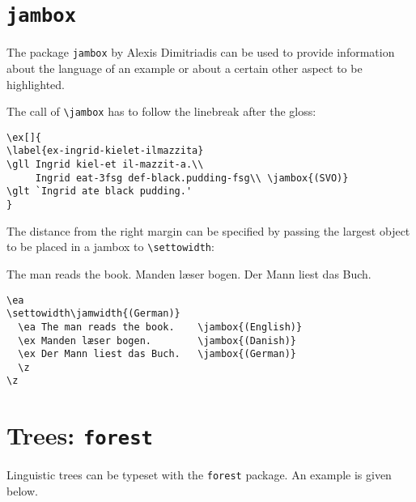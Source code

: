 \def\exfont{\normalsize\upshape}

\section{\texttt{jambox}}
\label{sec-jambox}


The package \texttt{jambox} by Alexis Dimitriadis can be used to provide information about the language of an example or
about a certain other aspect to be highlighted.
\settowidth{}
\eal
{}
\zl

The call of \verb+\jambox+ has to follow the linebreak after the gloss:
\begin{verbatim}
\ex[]{
\label{ex-ingrid-kielet-ilmazzita}
\gll Ingrid kiel-et il-mazzit-a.\\
     Ingrid eat-3fsg def-black.pudding-fsg\\ \jambox{(SVO)}
\glt `Ingrid ate black pudding.'
}
\end{verbatim}
The distance from the right margin can be specified by passing the largest object to be placed in a
jambox to \verb+\settowidth+:

\ea 
\settowidth{}
  \ea The man reads the book.    
  \ex Manden læser bogen.        
  \ex Der Mann liest das Buch.   
  \z 
\z

\begin{verbatim}
\ea 
\settowidth\jamwidth{(German)}
  \ea The man reads the book.    \jambox{(English)}
  \ex Manden læser bogen.        \jambox{(Danish)}
  \ex Der Mann liest das Buch.   \jambox{(German)}
  \z
\z
\end{verbatim}



\section{Trees: \texttt{forest}}
Linguistic trees can be typeset with the \verb+forest+ package. An example is given below.

